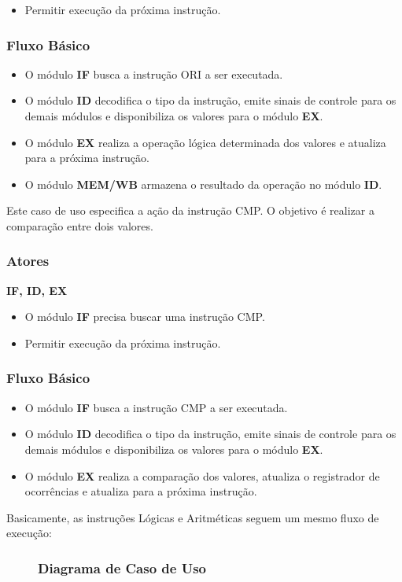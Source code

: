 \postconditions
\begin{itemize}	
	\item Permitir execução da próxima instrução.
\end{itemize}

\subsubsection*{Fluxo Básico}
\begin{itemize}
	\item O módulo \textbf{IF} busca a instrução ORI a ser executada.
	\item O módulo \textbf{ID} decodifica o tipo da instrução, emite sinais de controle para os demais módulos e disponibiliza os valores para o módulo \textbf{EX}.
	\item O módulo \textbf{EX} realiza a operação lógica determinada dos valores e atualiza para a próxima instrução.
	\item O módulo \textbf{MEM/WB} armazena o resultado da operação no módulo \textbf{ID}.
\end{itemize}


Este caso de uso especifica a ação da instrução CMP. O objetivo é realizar a comparação entre dois valores.

\subsubsection*{Atores}
\textbf{IF, ID, EX}
\preconditions 
\begin{itemize}
	\item O módulo \textbf{IF} precisa buscar uma instrução CMP.
\end{itemize}

\postconditions
\begin{itemize}	
	\item Permitir execução da próxima instrução.
\end{itemize}

\subsubsection*{Fluxo Básico}
\begin{itemize}
	\item O módulo \textbf{IF} busca a instrução CMP a ser executada.
	\item O módulo \textbf{ID} decodifica o tipo da instrução, emite sinais de controle para os demais módulos e disponibiliza os valores para o módulo \textbf{EX}.
	\item O módulo \textbf{EX} realiza a comparação dos valores, atualiza o registrador de ocorrências e atualiza para a próxima instrução.
\end{itemize}


Basicamente, as instruções Lógicas e Aritméticas seguem um mesmo fluxo de execução:

\begin{figure}[H]
	\subsubsection*{Diagrama de Caso de Uso}
		
\end{figure}
